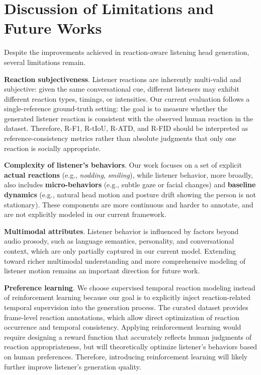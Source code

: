 \section{Discussion of Limitations and Future Works}  \label{app:limitations}

Despite the improvements achieved in reaction-aware listening head generation, several limitations remain. 

\textbf{Reaction subjectiveness}. Listener reactions are inherently multi-valid and subjective: given the same conversational cue, different listeners may exhibit different reaction types, timings, or intensities. Our current evaluation follows a single-reference ground-truth setting: the goal is to measure whether the generated listener reaction is consistent with the observed human reaction in the dataset. Therefore, R-F1, R-tIoU, R-ATD, and R-FID should be interpreted as reference-consistency metrics rather than absolute judgments that only one reaction is socially appropriate.

\textbf{Complexity of listener's behaviors}. Our work focuses on a set of explicit \textbf{actual reactions} (e.g., \textit{nodding}, \textit{smiling}), while listener behavior, more broadly, also includes \textbf{micro-behaviors} (e.g., subtle gaze or facial changes) and \textbf{baseline dynamics} (e.g., natural head motion and posture drift showing the person is not stationary). These components are more continuous and harder to annotate, and are not explicitly modeled in our current framework.

\textbf{Multimodal attributes}. Listener behavior is influenced by factors beyond audio prosody, such as language semantics, personality, and conversational context, which are only partially captured in our current model. Extending toward richer multimodal understanding and more comprehensive modeling of listener motion remains an important direction for future work.

\textbf{Preference learning}. We choose supervised temporal reaction modeling instead of reinforcement learning because our goal is to explicitly inject reaction-related temporal supervision into the generation process. The curated dataset provides frame-level reaction annotations, which allow direct optimization of reaction occurrence and temporal consistency. Applying reinforcement learning would require designing a reward function that accurately reflects human judgments of reaction appropriateness, but will theoretically optimize listener's behaviors based on human preferences. Therefore, introducing reinforcement learning will likely further improve listener's generation quality.


